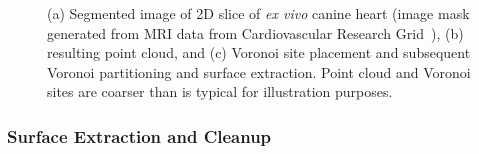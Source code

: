 \begin{figure}[htbp!]
{\label{fig:d2dvor2}}
%
\caption{(a) Segmented image of 2D slice of \textit{ex vivo} canine heart (image mask generated from MRI data from Cardiovascular Research Grid~\cite{cvgg}), (b) resulting point cloud, and (c) Voronoi site placement and subsequent Voronoi partitioning and surface extraction. Point cloud and Voronoi sites are coarser than is typical for illustration purposes.}
\label{fig:d2dvor}
\end{figure}

\subsubsection{Surface Extraction and Cleanup}

